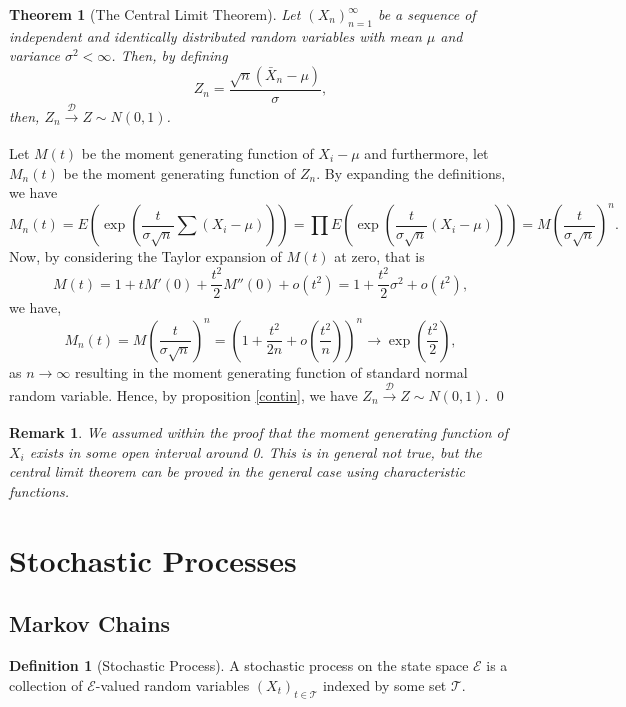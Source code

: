 \documentclass[
]{article}
\newtheorem{theorem}{Theorem}
\newtheorem*{remark}{Remark}
\theoremstyle{definition}
\newtheorem{definition}{Definition}[section]
\begin{document}
\begin{theorem}[The Central Limit Theorem]
  Let \((X_n)_{n = 1}^\infty\) be a sequence of independent and identically distributed 
  random variables with mean \(\mu\) and variance \(\sigma^2 < \infty\). Then, 
  by defining 
  \[Z_n = \frac{\sqrt{n}(\bar{X}_n - \mu)}{\sigma},\]
  then, \(Z_n \xrightarrow[]{\mathcal{D}} Z \sim N(0, 1)\).
\end{theorem}
\proof

Let \(M(t)\) be the moment generating function of \(X_i - \mu\) and
furthermore, let \(M_n(t)\) be the moment generating function of
\(Z_n\). By expanding the definitions, we have
\[M_n(t) = E \left(\exp\left( \frac{t}{\sigma\sqrt{n}} \sum(X_i - \mu) \right)\right) 
    = \prod E \left(\exp\left(\frac{t}{\sigma\sqrt{n}}(X_i - \mu)\right)\right) = 
    M\left(\frac{t}{\sigma\sqrt{n}}\right)^n.\] Now, by considering the
Taylor expansion of \(M(t)\) at zero, that is
\[M(t) = 1 + t M'(0) + \frac{t^2}{2} M''(0) + o(t^2) 
    = 1 + \frac{t^2}{2} \sigma^2 + o(t^2),\] we have,
\[M_n(t) = M\left(\frac{t}{\sigma\sqrt{n}}\right)^n = 
    \left(1 + \frac{t^2}{2n} + o\left(\frac{t^2}{n}\right)\right)^n \to 
    \exp\left(\frac{t^2}{2}\right),\] as \(n \to \infty\) resulting in
the moment generating function of standard normal random variable.
Hence, by proposition \ref{contin}, we have
\(Z_n \xrightarrow[]{\mathcal{D}} Z \sim N(0, 1)\). \qed

\begin{remark}
  We assumed within the proof that the moment generating function of \(X_i\) 
  exists in some open interval around 0. This is in general not true, but the 
  central limit theorem can be proved in the general case using characteristic 
  functions.
\end{remark}

\newpage

\hypertarget{stochastic-processes}{%
\section{Stochastic Processes}\label{stochastic-processes}}

\hypertarget{markov-chains}{%
\subsection{Markov Chains}\label{markov-chains}}

\begin{definition}[Stochastic Process]
  A stochastic process on the state space \(\mathcal{E}\) is a collection of 
  \(\mathcal{E}\)-valued random variables \((X_t)_{t \in \mathcal{T}}\) indexed 
  by some set \(\mathcal{T}\).
\end{definition}
\end{document}
